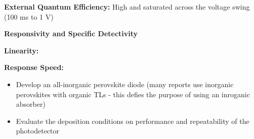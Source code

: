 \textbf{External Quantum Efficiency:}
High and saturated across the voltage swing (100 ms to 1 V)

\textbf{Responsivity and Specific Detectivity}

\textbf{Linearity:}

\textbf{Response Speed:}

\begin{itemize}
    \item Develop an all-inorganic perovskite diode (many reports use inorganic perovskites with organic TLs - this defies the purpose of using an inroganic absorber)
    \item Evaluate the deposition conditions on performance and repeatability of the photodetector
\end{itemize}


\cleardoublepage

